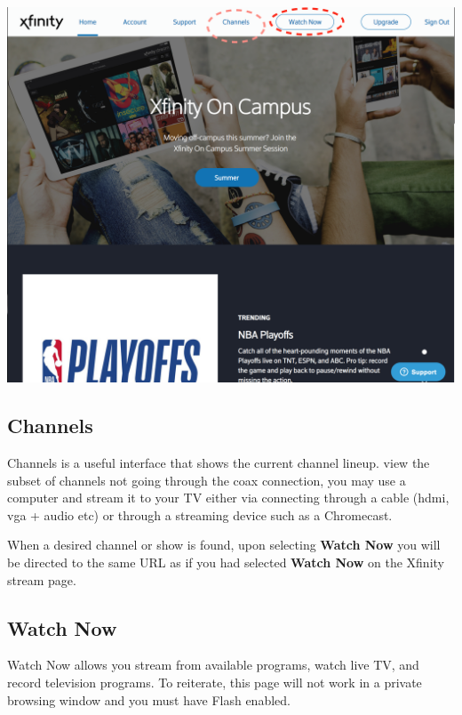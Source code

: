 \documentclass[a4paper, 11pt]{article}
\begin{document}
\includegraphics[width=\linewidth, keepaspectratio]{home.png}
\subsection*{
  Channels 
}

Channels is a useful interface that shows the current channel lineup. 
view the subset of channels not going through the coax connection, you may
use a computer and stream it to your TV either via connecting through a 
cable (hdmi, vga + audio etc) or through a streaming device such as a Chromecast.

When a desired channel or show is found, upon selecting \textbf{Watch Now} you
will be directed to the same URL as if you had selected \textbf{Watch Now} on
the Xfinity stream page.

\subsection*{
  Watch Now
}

Watch Now allows you stream from available programs, watch live TV, and record television programs.  To reiterate, this page will not work in a private 
browsing window and you must have Flash enabled.  
\end{document}
